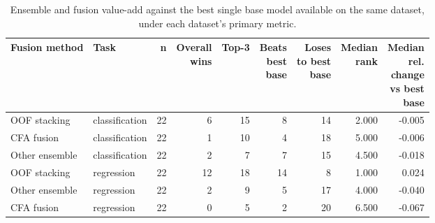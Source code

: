 \begin{table}[htbp]
\centering
\scriptsize
\setlength{\tabcolsep}{3pt}
\caption{Ensemble and fusion value-add against the best single base model available on the same dataset, under each dataset's primary metric.}
\label{tab:ensemble}
\begin{tabularx}{\textwidth}{@{}>{\raggedright\arraybackslash\hsize=1.000\hsize}X>{\raggedright\arraybackslash\hsize=1.000\hsize}Xrrrrrrr@{}}
\toprule
\textbf{Fusion method} & \textbf{Task} & \textbf{n} & \makecell[r]{\textbf{Overall}\\\textbf{wins}} & \textbf{Top-3} & \makecell[r]{\textbf{Beats}\\\textbf{best}\\\textbf{base}} & \makecell[r]{\textbf{Loses}\\\textbf{to best}\\\textbf{base}} & \makecell[r]{\textbf{Median}\\\textbf{rank}} & \makecell[r]{\textbf{Median}\\\textbf{rel.}\\\textbf{change}\\\textbf{vs best}\\\textbf{base}} \\
\midrule
OOF stacking & classification & 22 & 6 & 15 & 8 & 14 & 2.000 & -\allowbreak{}0.005 \\
CFA fusion & classification & 22 & 1 & 10 & 4 & 18 & 5.000 & -\allowbreak{}0.006 \\
Other ensemble & classification & 22 & 2 & 7 & 7 & 15 & 4.500 & -\allowbreak{}0.018 \\
OOF stacking & regression & 22 & 12 & 18 & 14 & 8 & 1.000 & 0.024 \\
Other ensemble & regression & 22 & 2 & 9 & 5 & 17 & 4.000 & -\allowbreak{}0.040 \\
CFA fusion & regression & 22 & 0 & 5 & 2 & 20 & 6.500 & -\allowbreak{}0.067 \\
\bottomrule
\end{tabularx}
\end{table}
